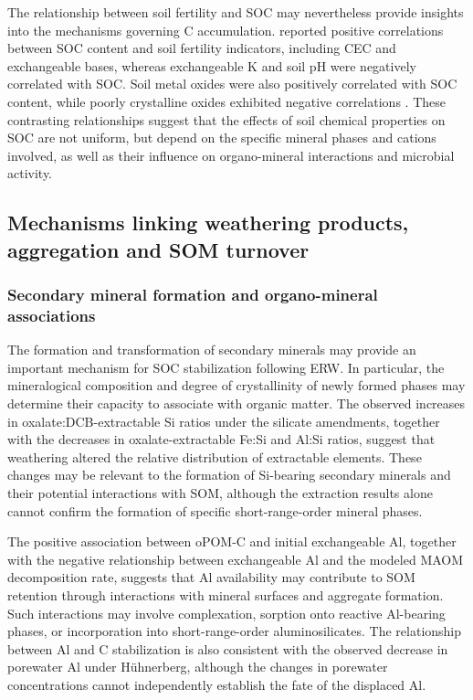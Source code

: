 \documentclass[preprint,12pt]{elsarticle}
\begin{document}
The relationship between soil fertility and SOC may nevertheless provide insights into the mechanisms governing C accumulation. \citep{maier2025parent} reported positive correlations between SOC content and soil fertility indicators, including CEC and exchangeable bases, whereas exchangeable K and soil pH were negatively correlated with SOC. Soil metal oxides were also positively correlated with SOC content, while poorly crystalline oxides exhibited negative correlations \citep{maier2025parent}. These contrasting relationships suggest that the effects of soil chemical properties on SOC are not uniform, but depend on the specific mineral phases and cations involved, as well as their influence on organo-mineral interactions and microbial activity.

\subsection{Mechanisms linking weathering products, aggregation and SOM turnover}
\label{subsec:stabilization}

\subsubsection{Secondary mineral formation and organo-mineral associations}

The formation and transformation of secondary minerals may provide an important mechanism for SOC stabilization following ERW. In particular, the mineralogical composition and degree of crystallinity of newly formed phases may determine their capacity to associate with organic matter. The observed increases in oxalate:DCB-extractable Si ratios under the silicate amendments, together with the decreases in oxalate-extractable Fe:Si and Al:Si ratios, suggest that weathering altered the relative distribution of extractable elements. These changes may be relevant to the formation of Si-bearing secondary minerals and their potential interactions with SOM, although the extraction results alone cannot confirm the formation of specific short-range-order mineral phases.

The positive association between oPOM-C and initial exchangeable Al, together with the negative relationship between exchangeable Al and the modeled MAOM decomposition rate, suggests that Al availability may contribute to SOM retention through interactions with mineral surfaces and aggregate formation. Such interactions may involve complexation, sorption onto reactive Al-bearing phases, or incorporation into short-range-order aluminosilicates. The relationship between Al and C stabilization is also consistent with the observed decrease in porewater Al under Hühnerberg, although the changes in porewater concentrations cannot independently establish the fate of the displaced Al.
\end{document}
